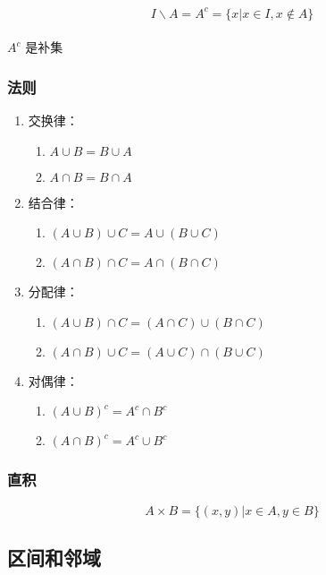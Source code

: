 \begin{equation}
I \backslash A = A^c = \{x | x \in I, x \notin A\}
\end{equation}

\paragraph{}
$A^c$ 是补集

\subsubsection{法则}
\begin{enumerate}
  \item 交换律：
    \begin{enumerate}
      \item $A \cup B = B \cup A$
      \item $A \cap B = B \cap A$
    \end{enumerate}
  \item 结合律：
    \begin{enumerate}
      \item $(A \cup B) \cup C = A \cup (B \cup C)$
      \item $(A \cap B) \cap C = A \cap (B \cap C)$
    \end{enumerate}
  \item 分配律：
    \begin{enumerate}
      \item $(A \cup B) \cap C = (A \cap C) \cup (B \cap C)$
      \item $(A \cap B) \cup C = (A \cup C) \cap (B \cup C)$
    \end{enumerate}
  \item 对偶律：
    \begin{enumerate}
      \item ${(A \cup B)}^c = A^c \cap B^c$
      \item ${(A \cap B)}^c = A^c \cup B^c$
    \end{enumerate}
\end{enumerate}

\subsubsection{直积}
\begin{equation}
A \times B = \{(x, y) | x \in A, y \in B\}
\end{equation}

\subsection{区间和邻域}

